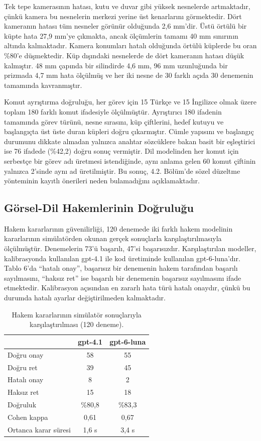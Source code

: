 \documentclass[preprint,12pt]{elsarticle}
\begin{document}
Tek tepe kamerasının hatası, kutu ve duvar gibi yüksek nesnelerde artmaktadır, çünkü kamera bu nesnelerin merkezi yerine üst kenarlarını görmektedir. Dört kameranın hatası tüm nesneler görünür olduğunda 2,6 mm'dir. Üstü örtülü bir küpte hata 27,9 mm'ye çıkmakta, ancak ölçümlerin tamamı 40 mm sınırının altında kalmaktadır. Kamera konumları hatalı olduğunda örtülü küplerde bu oran \%80'e düşmektedir. Küp dışındaki nesnelerde de dört kameranın hatası düşük kalmıştır. 48 mm çapında bir silindirde 4,6 mm, 96 mm uzunluğunda bir prizmada 4,7 mm hata ölçülmüş ve her iki nesne de 30 farklı açıda 30 denemenin tamamında kavranmıştır.

Komut ayrıştırma doğruluğu, her görev için 15 Türkçe ve 15 İngilizce olmak üzere toplam 180 farklı komut ifadesiyle ölçülmüştür. Ayrıştırıcı 180 ifadenin tamamında görev türünü, nesne sırasını, küp çiftlerini, hedef kutuyu ve başlangıçta üst üste duran küpleri doğru çıkarmıştır. Cümle yapısını ve başlangıç durumunu dikkate almadan yalnızca anahtar sözcüklere bakan basit bir eşleştirici ise 76 ifadede (\%42,2) doğru sonuç vermiştir. Dil modelinden her komut için serbestçe bir görev adı üretmesi istendiğinde, aynı anlama gelen 60 komut çiftinin yalnızca 2'sinde aynı ad üretilmiştir. Bu sonuç, 4.2. Bölüm'de sözel düzeltme yönteminin kayıtlı önerileri neden bulamadığını açıklamaktadır.

\hypertarget{guxf6rsel-dil-hakemlerinin-doux11fruluux11fu}{%
\subsection{Görsel-Dil Hakemlerinin Doğruluğu}\label{guxf6rsel-dil-hakemlerinin-doux11fruluux11fu}}

Hakem kararlarının güvenilirliği, 120 denemede iki farklı hakem modelinin kararlarının simülatörden okunan gerçek sonuçlarla karşılaştırılmasıyla ölçülmüştür. Denemelerin 73'ü başarılı, 47'si başarısızdır. Karşılaştırılan modeller, kalibrasyonda kullanılan gpt-4.1 ile kod üretiminde kullanılan gpt-6-luna'dır. Tablo 6'da ``hatalı onay'', başarısız bir denemenin hakem tarafından başarılı sayılmasını, ``haksız ret'' ise başarılı bir denemenin başarısız sayılmasını ifade etmektedir. Kalibrasyon açısından en zararlı hata türü hatalı onaydır, çünkü bu durumda hatalı ayarlar değiştirilmeden kalmaktadır.

\begin{table}[htbp]
\centering
\caption{Hakem kararlarının simülatör sonuçlarıyla karşılaştırılması (120 deneme).}
\label{tab:6}
\begin{tabular}{@{}l c c@{}}
\toprule
 & gpt-4.1 & gpt-6-luna \\
\midrule
Doğru onay & 58 & 55 \\
Doğru ret & 39 & 45 \\
Hatalı onay & 8 & 2 \\
Haksız ret & 15 & 18 \\
Doğruluk & \%80,8 & \%83,3 \\
Cohen kappa & 0,61 & 0,67 \\
Ortanca karar süresi & 1,6 s & 3,4 s \\
\bottomrule
\end{tabular}
\end{table}
\end{document}
